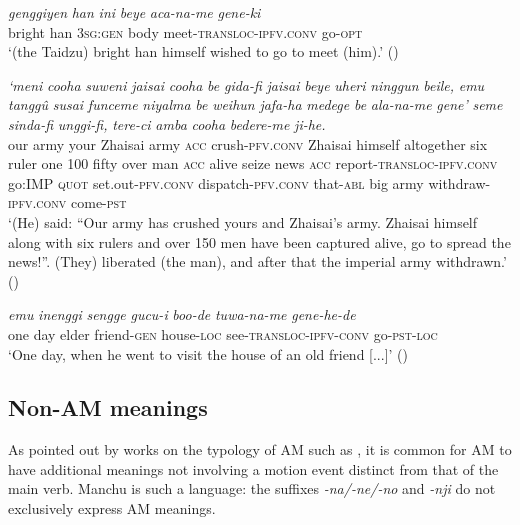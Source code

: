\documentclass{article}
\newcommand{\ipa}[1]{\textit{{\phon\mbox{#1}}}} %
\begin{document}
\begin{exe}
\ex \label{ex:acaname.geneki}
\gll
\ipa{genggiyen} 	\ipa{han} 	\ipa{ini} 	\ipa{beye} 	\ipa{aca-na-me} 	\ipa{gene-ki} \\
bright han \textsc{3sg:gen} body meet-\textsc{transloc-ipfv.conv} go-\textsc{opt} \\
\glt ‘(the Taidzu) bright han himself wished to go to meet (him).’ (\citealt[243, 121]{shunjuu92yargiyan})
\end{exe}

\begin{exe}
\ex \label{ex:alaname.gene}
\gll
\ipa{`meni} 	\ipa{cooha} 	\ipa{suweni} 	\ipa{jaisai} 	\ipa{cooha} 	\ipa{be} 	\ipa{gida-fi} 	\ipa{jaisai} 	\ipa{beye} 	\ipa{uheri} 	\ipa{ninggun} 	\ipa{beile,} 	\ipa{emu} 	\ipa{tanggû} 	\ipa{susai} 	\ipa{funceme} 	\ipa{niyalma} 	\ipa{be} 	\ipa{weihun} 	\ipa{jafa-ha} 	\ipa{medege} 	\ipa{be} 	\ipa{ala-na-me} 	\ipa{gene'} 	\ipa{seme} 	\ipa{sinda-fi} 	\ipa{unggi-fi,} 	\ipa{tere-ci} 	\ipa{amba} 	\ipa{cooha} 	\ipa{bedere-me} 	\ipa{ji-he.} \\
our army your Zhaisai army \textsc{acc} crush-\textsc{pfv.conv} Zhaisai himself altogether six ruler one 100 fifty over man \textsc{acc} alive seize news \textsc{acc} report-\textsc{transloc-ipfv.conv} go:\textsc{IMP} \textsc{quot} set.out-\textsc{pfv.conv} dispatch-\textsc{pfv.conv} that-\textsc{abl} big army withdraw-\textsc{ipfv.conv} come-\textsc{pst} \\
\glt ‘(He) said: “Our army has crushed yours and Zhaisai’s army. Zhaisai himself along with six rulers and over 150 men have been captured alive, go to spread the news!”. (They) liberated (the man), and after that the imperial army withdrawn.’ (\citealt[227, 20-21]{shunjuu92yargiyan})
\end{exe}

 \begin{exe}
\ex \label{ex:tuwaname.genehe}
\gll
  \ipa{emu}	\ipa{inenggi}	\ipa{sengge}	\ipa{gucu-i}	\ipa{boo-de}	\ipa{tuwa-na-me}	\ipa{gene-he-de} \\
one day elder friend-\textsc{gen} house-\textsc{loc} see-\textsc{transloc-ipfv-conv} go-\textsc{pst-loc} \\
\glt ‘One day, when he went to visit the house of an old friend [...]’ (\citet[487;784]{stary83sakda})
\end{exe}

\subsection{Non-AM meanings}
As pointed out by works on the typology of AM such as \citet[3]{guillaume16am}, it is common for AM to have additional meanings not involving a motion event distinct from that of the main verb. Manchu is such a language: the suffixes \ipa{-na/-ne/-no} and \ipa{-nji} do not exclusively express AM meanings. 
\end{document}
